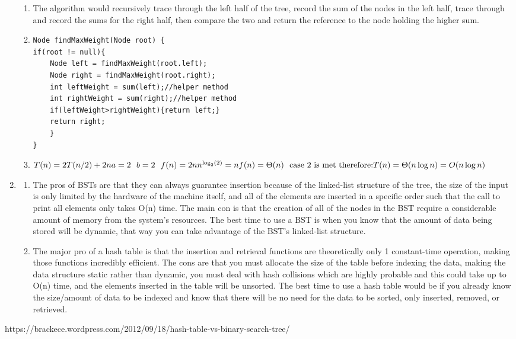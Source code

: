 \documentclass{article}
\begin{document}
\begin{enumerate}
\begin{enumerate}
	\item The algorithm would recursively trace through the left half of the tree, record the sum of the nodes in the left half, trace through and record the sums for the right half, then 
	compare the two and return the reference to the node holding the higher sum.
	\item\begin{lstlisting}
Node findMaxWeight(Node root) {
if(root != null){
	Node left = findMaxWeight(root.left);
	Node right = findMaxWeight(root.right);
	int leftWeight = sum(left);//helper method
	int rightWeight = sum(right);//helper method
	if(leftWeight>rightWeight){return left;}
	return right;
	}
}
	\end{lstlisting}
	\item\begin{math}T(n)=2T(n/2)+2n\\
		a=2\ \ b=2\ \ f(n)=2n\\
		n^{\log_2(2)}=n\\
		f(n)=\Theta(n)\ \mbox{ case 2 is met therefore:}\\
		T(n)=\Theta(n\log n)=O(n\log n)
		\end{math}
	\end{enumerate}
\item \begin{enumerate}
	\item The pros of BSTs are that they can always guarantee insertion because of the linked-list structure of the tree, the size of the input is only limited by the hardware of the machine		 itself, and all of the elements are inserted in a specific order such that the call to print all elements only takes O(n) time. The main con is that the creation of all of the nodes in the BST 
	require a considerable amount of memory from the system's resources. The best time to use a BST is when you know that the amount of data being stored will be dynamic, that way
	you can take advantage of the BST's linked-list structure.
	\item The major pro of a hash table is that the insertion and retrieval functions are theoretically only 1 constant-time operation, making those functions incredibly efficient. The cons 
	are that you must allocate the size of the table before indexing the data, making the data structure static rather than dynamic, you must deal with hash collisions which are highly
	probable and this could take up to O(n) time, and the elements inserted in the table will be unsorted. The best time to use a hash table would be if you already know the size/amount of 
	data to be indexed and know that there will be no need for the data to be sorted, only inserted, removed, or retrieved.
	\end{enumerate}
\end{enumerate}
https://brackece.wordpress.com/2012/09/18/hash-table-vs-binary-search-tree/
\end{document}
